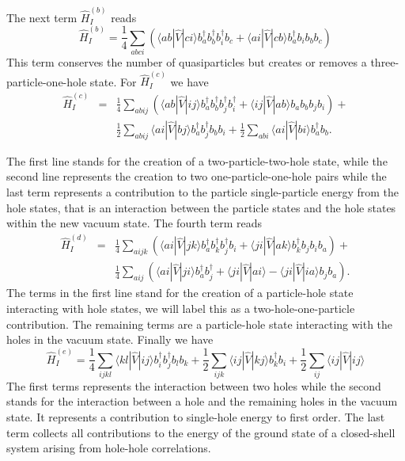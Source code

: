 \documentclass[graybox,sectrefs,envcountresetchap,open=right]{svmonodo}
\begin{document}
The next term $\hat{H}_I^{(b)}$  reads
\begin{equation}
	 \hat{H}_I^{(b)} = \frac{1}{4} \sum_{abci}\left(\langle ab|\hat{V}|ci\rangle b_a^\dagger b_b^\dagger b_i^\dagger b_c +\langle ai|\hat{V}|cb\rangle b_a^\dagger b_i b_b b_c\right) \label{eq:2-67b}
\end{equation}
This term conserves the number of quasiparticles but creates or removes a 
three-particle-one-hole  state. 
For $\hat{H}_I^{(c)}$  we have
\begin{eqnarray}
	\hat{H}_I^{(c)}& =& \frac{1}{4}
		\sum_{abij}\left(\langle ab|\hat{V}|ij\rangle b_a^\dagger b_b^\dagger b_j^\dagger b_i^\dagger +
		\langle ij|\hat{V}|ab\rangle b_a  b_b b_j b_i \right)+  \nonumber \\
	&&	\frac{1}{2}\sum_{abij}\langle ai|\hat{V}|bj\rangle b_a^\dagger b_j^\dagger b_b b_i + 
		\frac{1}{2}\sum_{abi}\langle ai|\hat{V}|bi\rangle b_a^\dagger b_b. \label{eq:2-68c}
\end{eqnarray}




The first line stands for the creation of a two-particle-two-hole state, while the second line represents
the creation to two one-particle-one-hole pairs
while the last term represents a contribution to the particle single-particle energy
from the hole states, that is an interaction between the particle states and the hole states
within the new vacuum  state.
The fourth term reads
\begin{eqnarray}
	 \hat{H}_I^{(d)}& = &\frac{1}{4} 
	 	\sum_{aijk}\left(\langle ai|\hat{V}|jk\rangle b_a^\dagger b_k^\dagger b_j^\dagger b_i+
\langle ji|\hat{V}|ak\rangle b_k^\dagger b_j b_i b_a\right)+\nonumber \\
&&\frac{1}{4}\sum_{aij}\left(\langle ai|\hat{V}|ji\rangle b_a^\dagger b_j^\dagger+
\langle ji|\hat{V}|ai\rangle - \langle ji|\hat{V}|ia\rangle b_j b_a \right). \label{eq:2-69d} 
\end{eqnarray}
The terms in the first line  stand for the creation of a particle-hole state 
interacting with hole states, we will label this as a two-hole-one-particle contribution. 
The remaining terms are a particle-hole state interacting with the holes in the vacuum state. 
Finally we have 
\begin{equation}
	\hat{H}_I^{(e)} = \frac{1}{4}
		 \sum_{ijkl}
		 \langle kl|\hat{V}|ij\rangle b_i^\dagger b_j^\dagger b_l b_k+
	        \frac{1}{2}\sum_{ijk}\langle ij|\hat{V}|kj\rangle b_k^\dagger b_i
	        +\frac{1}{2}\sum_{ij}\langle ij|\hat{V}|ij\rangle \label{eq:2-70d}
\end{equation}
The first terms represents the 
interaction between two holes while the second stands for the interaction between a hole and the remaining holes in the vacuum state.
It represents a contribution to single-hole energy  to first order.
The last term collects all contributions to the energy of the ground state of a closed-shell system arising
from hole-hole correlations.
\end{document}
